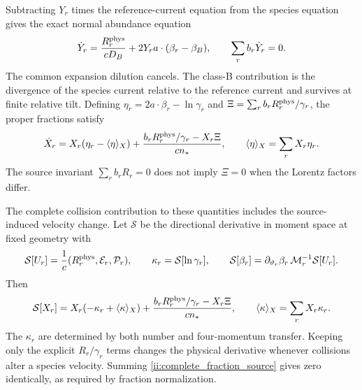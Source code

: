 Subtracting $Y_r$ times the reference-current equation from the species equation gives the exact normal abundance equation
\begin{equation}
 \dot Y_r=\frac{R_r^{\rm phys}}{cD_B}
             +2Y_ra\cdot(\beta_r-\beta_B),\qquad
 \sum_rb_r\dot Y_r=0.
 \label{ii:abundance_normal}
\end{equation}
The common expansion dilution cancels. The class-B contribution is the divergence of the species current relative to the reference current and survives at finite relative tilt. Defining
$\eta_r=2a\cdot\beta_r-\dot{\ln\gamma_r}$ and
$\Xi=\sum_rb_rR_r^{\rm phys}/\gamma_r$, the proper fractions satisfy
\begin{equation}
 \dot X_r=X_r(\eta_r-\langle\eta\rangle_X)
       +\frac{b_rR_r^{\rm phys}/\gamma_r-X_r\Xi}{cn_*},
 \qquad \langle\eta\rangle_X=\sum_rX_r\eta_r.
 \label{ii:abundance_proper}
\end{equation}
The source invariant $\sum_rb_rR_r=0$ does not imply $\Xi=0$ when the Lorentz factors differ.

The complete collision contribution to these quantities includes the source-induced velocity change. Let $\mathcal S$ be the directional derivative in moment space at fixed geometry with
\begin{equation}
 \mathcal S[U_r]=\frac1c(R_r^{\rm phys},\mathcal E_r,\mathcal P_r),
 \qquad \kappa_r=\mathcal S[\ln\gamma_r],\qquad
 \mathcal S[\beta_r]=\partial_{\vartheta_r}\beta_r\,
            \mathcal M_r^{-1}\mathcal S[U_r].
 \label{ii:collision_direction}
\end{equation}
Then
\begin{equation}
 \mathcal S[X_r]=X_r(-\kappa_r+\langle\kappa\rangle_X)
      +\frac{b_rR_r^{\rm phys}/\gamma_r-X_r\Xi}{cn_*},
 \qquad \langle\kappa\rangle_X=\sum_rX_r\kappa_r.
 \label{ii:complete_fraction_source}
\end{equation}
The $\kappa_r$ are determined by both number and four-momentum transfer. Keeping only the explicit $R_r/\gamma_r$ terms changes the physical derivative whenever collisions alter a species velocity. Summing \eqref{ii:complete_fraction_source} gives zero identically, as required by fraction normalization.

